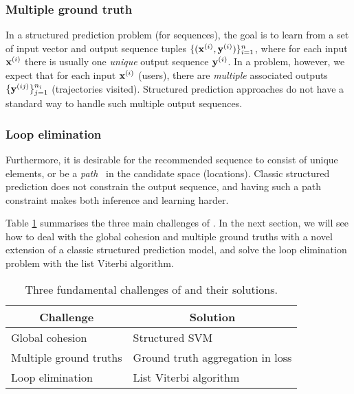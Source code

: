%
\subsubsection{Multiple ground truth}
In a structured prediction problem (for sequences), the goal is to learn from a set of
input vector and output sequence tuples
$\{ (\mathbf{x}^{({i})}, \mathbf{y}^{({i})}) \}_{i = 1}^n$, where
for each input $\mathbf{x}^{({i})}$ there is usually one \emph{unique} output sequence $\mathbf{y}^{({i})}$.
In a {\seqrec} problem, however, we expect that %
for each input $\mathbf{x}^{({i})}$ (\eg users),
there are \emph{multiple} associated outputs
$\{ \mathbf{y}^{({ij})} \}_{j=1}^{n_i}$ (\eg trajectories visited).
Structured prediction approaches do not have a standard way to handle such multiple output sequences.


%
\subsubsection{Loop elimination}
Furthermore, it is desirable for the recommended sequence to consist of unique elements,
or be a {\em path}~\cite{west2001introduction} in the candidate space (\eg locations).
Classic structured prediction does not constrain the output sequence, and having such a
path constraint makes both inference and learning harder.



Table \ref{tbl:challenges} summarises the three main challenges of {\trajrec}.
In the next section, we will see how to deal with the global cohesion and multiple ground truths with a novel extension of a classic structured prediction model, and solve the loop elimination problem with the list Viterbi algorithm.

\begin{table}[!h]
	\centering
	\begin{tabular}{ll}
	\hline
	\hline
	\multicolumn{1}{c}{\bf Challenge} & \multicolumn{1}{c}{\bf Solution}            \\ \hline
	Global cohesion                    & Structured SVM                             \\ \hline
	Multiple ground truths             & Ground truth aggregation in loss 			\\ \hline
	Loop elimination                   & List Viterbi algorithm                		\\ \hline  
	\end{tabular}
	\caption{Three fundamental challenges of {\trajrec} and their solutions.}
	\label{tbl:challenges}
\end{table}


